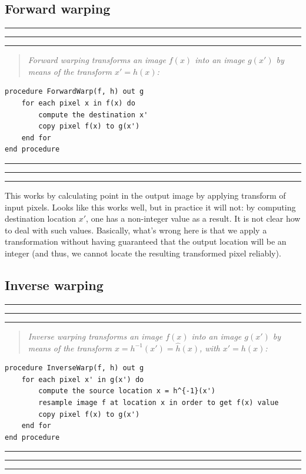 \documentclass[10pt]{report}
\begin{document}
\subsection{Forward warping}
\label{sec:org9ed9167}
\vspace*{0.6cm}\hrule
\hrule
\hrule
\vspace*{0.4cm}
\begin{quote}
\emph{Forward warping transforms an image \(f(x)\) into an image \(g(x')\) by means of the transform \(x' = h(x)\):}
\end{quote}

\begin{verbatim}
procedure ForwardWarp(f, h) out g
    for each pixel x in f(x) do
        compute the destination x'
        copy pixel f(x) to g(x')
    end for
end procedure
\end{verbatim}
\vspace*{0.6cm}\hrule
\hrule
\hrule
\vspace*{0.4cm}

This works by calculating point in the output image by applying transform of
input pixels. Looks like this works well, but in practice it will not: by
computing destination location \(x'\), one has a non-integer value as a result.
It is not clear how to deal with such values. Basically, what's wrong here is
that we apply a transformation without having guaranteed that the output
location will be an integer (and thus, we cannot locate the resulting
transformed pixel reliably).

\subsection{Inverse warping}
\label{sec:orgb2340b3}
\vspace*{0.6cm}\hrule
\hrule
\hrule
\vspace*{0.4cm}
\begin{quote}
\emph{Inverse warping transforms an image \(f(x)\) into an image \(g(x')\) by means of the transform \(x = h^{-1}(x') = \hat{h}(x)\), with \(x' = h(x)\):}
\end{quote}

\begin{verbatim}
procedure InverseWarp(f, h) out g
    for each pixel x' in g(x') do
        compute the source location x = h^{-1}(x')
        resample image f at location x in order to get f(x) value
        copy pixel f(x) to g(x')
    end for
end procedure
\end{verbatim}
\vspace*{0.6cm}\hrule
\hrule
\hrule
\vspace*{0.4cm}
\end{document}
